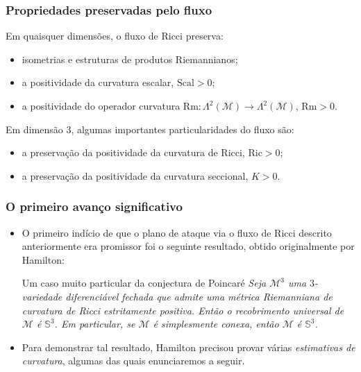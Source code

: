 \documentclass{beamer}
\newcommand{\Rm}{\mathrm{Rm}}
\newcommand{\Ric}{\mathrm{Ric}}
\newcommand{\Scal}{\mathrm{Scal}}
\newcommand{\mm}{\mathcal{M}}
\newcommand{\parent}[1]{\left( #1 \right)}
\begin{document}
\begin{frame}
\frametitle{Propriedades preservadas pelo fluxo}
Em quaisquer dimensões, o fluxo de Ricci preserva:
\begin{itemize}
\item isometrias e estruturas de produtos Riemannianos;
\item a positividade da curvatura escalar, $\Scal > 0$;
\item a positividade do operador curvatura $\Rm: \Lambda^2\parent{\mm} \to \Lambda^2\parent{\mm}$, $\Rm > 0$.
\end{itemize} 
Em dimensão $3$, algumas importantes particularidades do fluxo são:
\begin{itemize}
\item a preservação da positividade da curvatura de Ricci, $\Ric > 0$;
\item a preservação da positividade da curvatura seccional, $K > 0$.
\end{itemize}
\end{frame}


\begin{frame}
\frametitle{O primeiro avanço significativo}
\begin{itemize}
\item O primeiro indício de que o plano de ataque via o fluxo de Ricci descrito anteriormente era promissor foi o seguinte resultado, obtido originalmente por Hamilton:

\begin{block}{Um caso muito particular da conjectura de Poincaré}
\emph{Seja $\mm^3$ uma $3$-variedade diferenciável fechada que admite uma métrica Riemanniana de curvatura de Ricci estritamente positiva. Então o recobrimento universal de $\mm$ é $\mathbb{S}^3$. Em particular, se $\mm$ é simplesmente conexa, então $\mm$ é $\mathbb{S}^3$.}
\end{block} 
\item Para demonstrar tal resultado, Hamilton precisou provar várias \emph{estimativas de curvatura}, algumas das quais enunciaremos a seguir. 
\end{itemize}
\end{frame}
\end{document}
